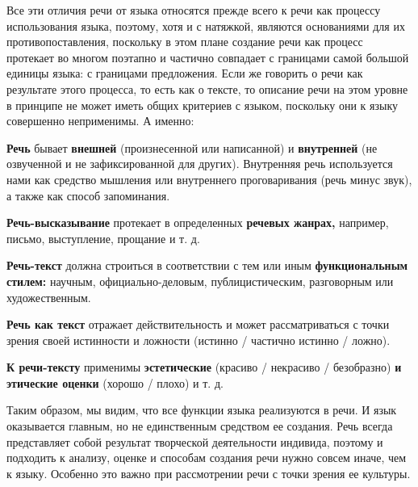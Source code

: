 Все эти отличия речи от языка относятся прежде всего к речи как процессу использования языка, поэтому, хотя и с натяжкой, являются основаниями для их противопоставления, поскольку в этом плане создание речи как процесс протекает во многом поэтапно и частично совпадает с границами самой большой единицы языка: с границами предложения.
Если же говорить о речи как результате этого процесса, то есть как о тексте, то описание речи на этом уровне в принципе не может иметь общих критериев с языком, поскольку они к языку совершенно неприменимы.
А именно:

\textbf{Речь} бывает \textbf{внешней} (произнесенной или написанной) и \textbf{внутренней} (не озвученной и не зафиксированной для других).
Внутренняя речь используется нами как средство мышления или внутреннего проговаривания (речь минус звук), а также как способ запоминания.

\textbf{Речь-высказывание} протекает в определенных \textbf{речевых жанрах,} например, письмо, выступление, прощание и т. д.

\textbf{Речь-текст} должна строиться в соответствии с тем или иным \textbf{функциональным стилем:} научным, официально-деловым, публицистическим, разговорным или художественным.

\textbf{Речь как текст} отражает действительность и может рассматриваться с точки зрения своей истинности и ложности (истинно / частично истинно / ложно).

\textbf{К речи-тексту} применимы \textbf{эстетические} (красиво / некрасиво / безобразно) \textbf{и этические оценки} (хорошо / плохо) и т. д.

Таким образом, мы видим, что все функции языка реализуются в речи.
И язык оказывается главным, но не единственным средством ее создания.
Речь всегда представляет собой результат творческой деятельности индивида, поэтому и подходить к анализу, оценке и способам создания речи нужно совсем иначе, чем к языку.
Особенно это важно при рассмотрении речи с точки зрения ее культуры.
